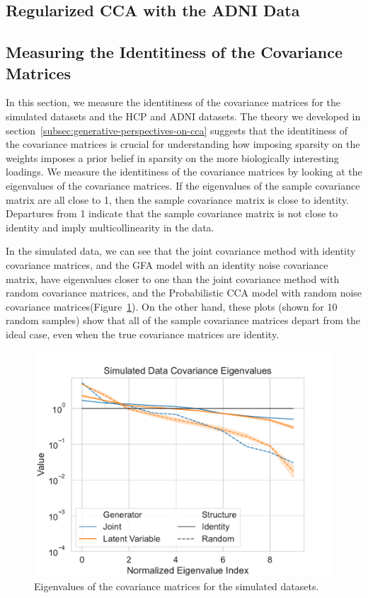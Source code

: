 \subsection{Regularized CCA with the ADNI Data}



\subsection{Measuring the Identitiness of the Covariance Matrices}

In this section, we measure the identitiness of the covariance matrices for the simulated datasets and the HCP and ADNI datasets.
The theory we developed in section~\ref{subsec:generative-perspectives-on-cca} suggests that the identitiness of the covariance matrices is crucial for understanding how imposing sparsity on the weights imposes a prior belief in sparsity on the more biologically interesting loadings.
We measure the identitiness of the covariance matrices by looking at the eigenvalues of the covariance matrices.
If the eigenvalues of the sample covariance matrix are all close to 1, then the sample covariance matrix is close to identity.
Departures from 1 indicate that the sample covariance matrix is not close to identity and imply multicollinearity in the data.

In the simulated data, we can see that the joint covariance method with identity covariance matrices, and the GFA model with an identity noise covariance matrix, have eigenvalues closer to one than the joint covariance method with random covariance matrices, and the Probabilistic CCA model with random noise covariance matrices(Figure~\ref{fig:covariance-eigenvalues-simulated}).
On the other hand, these plots (shown for 10 random samples) show that all of the sample covariance matrices depart from the ideal case, even when the true covariance matrices are identity.

\begin{figure}
\centering
\includegraphics[width=0.8\linewidth]{figures/regularization/covariance/simulated_covariance_eigenvalues.pdf}
\caption{Eigenvalues of the covariance matrices for the simulated datasets.}\label{fig:covariance-eigenvalues-simulated}
\end{figure}

